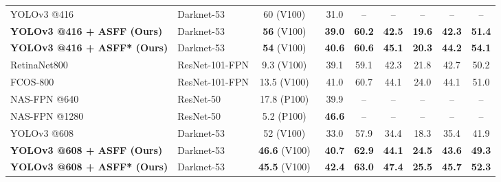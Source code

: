 \documentclass[10pt,twocolumn,letterpaper]{article}
\begin{document}
\begin{table*}[htbp]
\begin{center}
{{\begin{threeparttable}
\begin{tabular}{l|l|c|ccc|ccc}
						YOLOv3 @416 \cite{yolov3}                  & Darknet-53                                     & 60 (V100)\                                       & 31.0            & --        & --       & --         & --         & --        \\
						\textbf{YOLOv3 @416 + ASFF (Ours)}                  & Darknet-53                 & \textbf{56} (V100)\                       & \textbf{39.0} & \textbf{60.2} &\textbf{42.5}  & \textbf{19.6}  & \textbf{42.3} & \textbf{51.4}  \\
						\textbf{YOLOv3 @416 + ASFF* (Ours)}                  & Darknet-53                 & \textbf{54} (V100)\                       & \textbf{40.6} & \textbf{60.6} &\textbf{45.1}  & \textbf{20.3}  & \textbf{44.2} & \textbf{54.1}  \\ \hline
RetinaNet800 \cite{focal-loss}            & ResNet-101-FPN                            & 9.3 (V100)\                                      & 39.1 & 59.1       & 42.3       & 21.8         & 42.7         & 50.2        \\
						FCOS-800 \cite{fcos}                          & ResNet-101-FPN                            & 13.5 (V100)\
						& 41.0            &60.7          &44.1        &24.0          &44.1         &51.0         \\
NAS-FPN @640 \cite{nas-fpn}              &ResNet-50                                    & 17.8 (P100)\
						& 39.9            & --          & --          & --         &  --         &   --      \\
						NAS-FPN @1280\cite{nas-fpn}              &ResNet-50                                    & 5.2 (P100)\
						& \textbf{46.6}            &  --         &  --         &  --          &--           & --       \\
						YOLOv3 @608 \cite{yolov3}                  & Darknet-53                                     & 52 (V100)\                                       & 33.0            & 57.9        & 34.4       & 18.3         & 35.4        & 41.9        \\
						\textbf{YOLOv3 @608 + ASFF (Ours) } & Darknet-53                                     & \textbf{46.6} (V100)\                                       & \textbf{40.7}  & \textbf{62.9} & \textbf{44.1} & \textbf{24.5} & \textbf{43.6} &\textbf{49.3}   \\
						\textbf{YOLOv3 @608 + ASFF* (Ours) } & Darknet-53                                     & \textbf{45.5} (V100)\                                       & \textbf{42.4}  & \textbf{63.0} & \textbf{47.4} & \textbf{25.5} & \textbf{45.7} &\textbf{52.3}      \\

\end{tabular}
\end{threeparttable}}}
\end{center}
\end{table*}
\end{document}

